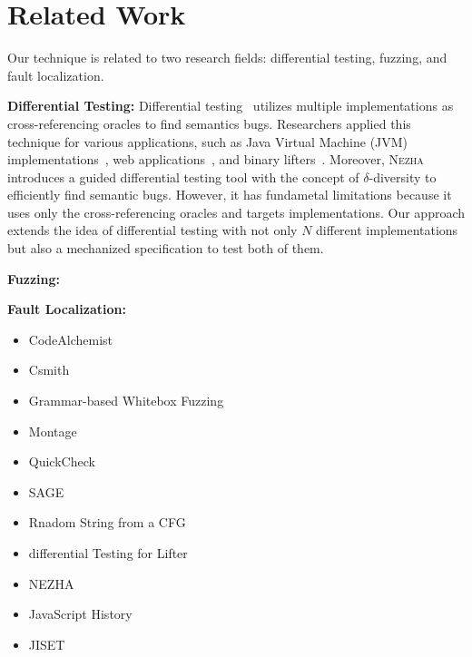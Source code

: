 \section{Related Work}\label{sec:related}

Our technique is related to two research fields: differential testing, fuzzing,
and fault localization.

\textbf{Differential Testing:} Differential testing~\cite{???} utilizes multiple
implementations as cross-referencing oracles to find semantics bugs.
Researchers applied this technique for various applications, such as Java
Virtual Machine (JVM) implementations~\cite{???}, web applications~\cite{???},
and binary lifters~\cite{ir-diff-test}.  Moreover, \textsc{Nezha} introduces a
guided differential testing tool with the concept of $\delta$-diversity to
efficiently find semantic bugs.  However, it has fundametal limitations because
it uses only the cross-referencing oracles and targets implementations.  Our
approach extends the idea of differential testing with not only $N$ different
implementations but also a mechanized specification to test both of them.

\textbf{Fuzzing:} 

\textbf{Fault Localization:} 

\begin{itemize}
  \item CodeAlchemist\cite{codealchemist}
  \item Csmith\cite{csmith}
  \item Grammar-based Whitebox Fuzzing\cite{grammar-whitebox}
  \item Montage\cite{montage}
  \item QuickCheck\cite{quickcheck}
  \item SAGE\cite{sage}
  \item Rnadom String from a CFG\cite{cfg-gen}
  \item differential Testing for Lifter\cite{ir-diff-test}
  \item NEZHA\cite{nezha}
  \item JavaScript History\cite{js-hopl}
  \item JISET\cite{jiset}
\end{itemize}
